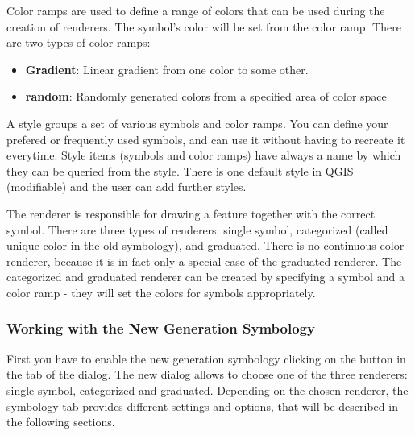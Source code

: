 
Color ramps are used to define a range of colors that can be used during 
the creation of renderers. The symbol's color will be set from the color ramp. 
There are two types of color ramps:
 
\begin{itemize}
\item \textbf{Gradient}: Linear gradient from one color to some other.
\item \textbf{random}: Randomly generated colors from a specified area of 
color space 
\end{itemize}


A style groups a set of various symbols and color ramps. You can define your 
prefered or frequently used symbols, and can use it  without having to recreate 
it everytime. Style items (symbols and color ramps) have always a name by which 
they can be queried from the style. There is one default style in QGIS (modifiable) 
and the user can add further styles.


The renderer is responsible for drawing a feature together with the correct 
symbol. There are three types of renderers: single symbol, categorized (called 
unique color in the old symbology), and graduated. There is no continuous color 
renderer, because it is in fact only a special case of the graduated renderer. 
The categorized and graduated renderer can be created by specifying a symbol 
and a color ramp - they will set the colors for symbols appropriately. 

\subsubsection{Working with the New Generation Symbology}

First you have to enable the new generation symbology clicking on the 
 button in the  tab of the 
 dialog. The new dialog allows to choose one of the 
three renderers: single symbol, categorized and graduated. Depending on the 
chosen renderer, the symbology tab provides different settings and options, that 
will be described in the following sections.


